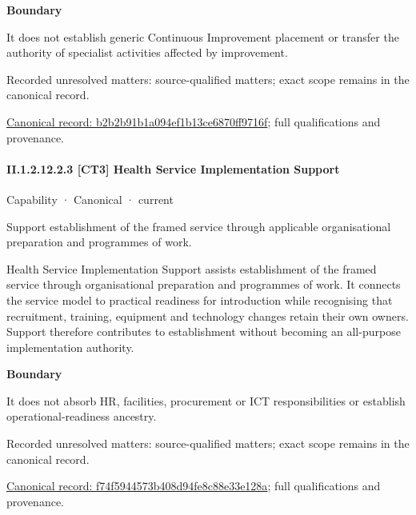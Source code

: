 \textbf{Boundary}



It does not establish generic Continuous Improvement placement or transfer the authority of specialist activities affected by improvement.


{\small Recorded unresolved matters: source-qualified matters; exact scope remains in the canonical record.}\par
{\footnotesize \href{../../../../../../../continuum/strategy/capability/b2b2b91b1a094ef1b13ce6870ff9716f.md}{Canonical record: b2b2b91b1a094ef1b13ce6870ff9716f}; full qualifications and provenance.}\par
\paragraph*{II.1.2.12.2.3 [CT3] Health Service Implementation Support}
\label{navigation:II.1.2.12.2.3}

\label{element:f74f5944573b408d94fe8c88e33e128a}
{\small Capability · Canonical · current}\par

Support establishment of the framed service through applicable organisational preparation and programmes of work.



Health Service Implementation Support assists establishment of the framed service through organisational preparation and programmes of work. It connects the service model to practical readiness for introduction while recognising that recruitment, training, equipment and technology changes retain their own owners. Support therefore contributes to establishment without becoming an all-purpose implementation authority.



\textbf{Boundary}



It does not absorb HR, facilities, procurement or ICT responsibilities or establish operational-readiness ancestry.


{\small Recorded unresolved matters: source-qualified matters; exact scope remains in the canonical record.}\par
{\footnotesize \href{../../../../../../../continuum/strategy/capability/f74f5944573b408d94fe8c88e33e128a.md}{Canonical record: f74f5944573b408d94fe8c88e33e128a}; full qualifications and provenance.}\par

